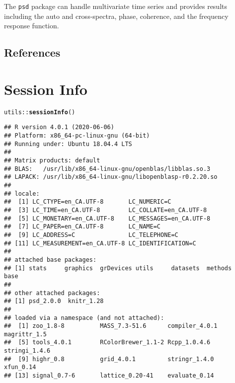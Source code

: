 \documentclass[11pt]{article}\usepackage[]{graphicx}\usepackage[]{color}
\makeatletter
\newcommand{\hlopt}[1]{\textcolor[rgb]{0,0,0}{#1}}%
\newcommand{\hlstd}[1]{\textcolor[rgb]{0.345,0.345,0.345}{#1}}%
\newcommand{\hlkwd}[1]{\textcolor[rgb]{0.737,0.353,0.396}{\textbf{#1}}}%
\newenvironment{kframe}{%
 \def\at@end@of@kframe{}%
 \ifinner\ifhmode%
  \def\at@end@of@kframe{\end{minipage}}%
  \begin{minipage}{\columnwidth}%
 \fi\fi%
 \def\FrameCommand##1{\hskip\@totalleftmargin \hskip-\fboxsep
 \colorbox{shadecolor}{##1}\hskip-\fboxsep
     \hskip-\linewidth \hskip-\@totalleftmargin \hskip\columnwidth}%
 \MakeFramed {\advance\hsize-\width
   \@totalleftmargin\z@ \linewidth\hsize
   \@setminipage}}%
 {\par\unskip\endMakeFramed%
 \at@end@of@kframe}
\newenvironment{knitrout}{}{} %
\newcommand{\Rcmd}[1]{\texttt{#1}}
\makeatother
\begin{document}
The \Rcmd{psd} package can handle multivariate time series and provides results including the auto and cross-spectra, phase, coherence, and the frequency response function.  


\subsection{References}


\section*{Session Info}
\begin{knitrout}
\color{fgcolor}\begin{kframe}
\begin{alltt}
\hlstd{utils}\hlopt{::}\hlkwd{sessionInfo}\hlstd{()}
\end{alltt}
\begin{verbatim}
## R version 4.0.1 (2020-06-06)
## Platform: x86_64-pc-linux-gnu (64-bit)
## Running under: Ubuntu 18.04.4 LTS
## 
## Matrix products: default
## BLAS:   /usr/lib/x86_64-linux-gnu/openblas/libblas.so.3
## LAPACK: /usr/lib/x86_64-linux-gnu/libopenblasp-r0.2.20.so
## 
## locale:
##  [1] LC_CTYPE=en_CA.UTF-8       LC_NUMERIC=C              
##  [3] LC_TIME=en_CA.UTF-8        LC_COLLATE=en_CA.UTF-8    
##  [5] LC_MONETARY=en_CA.UTF-8    LC_MESSAGES=en_CA.UTF-8   
##  [7] LC_PAPER=en_CA.UTF-8       LC_NAME=C                 
##  [9] LC_ADDRESS=C               LC_TELEPHONE=C            
## [11] LC_MEASUREMENT=en_CA.UTF-8 LC_IDENTIFICATION=C       
## 
## attached base packages:
## [1] stats     graphics  grDevices utils     datasets  methods   base     
## 
## other attached packages:
## [1] psd_2.0.0  knitr_1.28
## 
## loaded via a namespace (and not attached):
##  [1] zoo_1.8-8          MASS_7.3-51.6      compiler_4.0.1     magrittr_1.5      
##  [5] tools_4.0.1        RColorBrewer_1.1-2 Rcpp_1.0.4.6       stringi_1.4.6     
##  [9] highr_0.8          grid_4.0.1         stringr_1.4.0      xfun_0.14         
## [13] signal_0.7-6       lattice_0.20-41    evaluate_0.14
\end{verbatim}
\end{kframe}
\end{knitrout}



\end{document}
